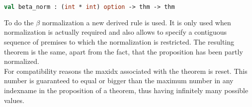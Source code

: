 \begin{lstlisting}[language=ML,breaklines=true]
val beta_norm : (int * int) option -> thm -> thm
\end{lstlisting}

To do the $\beta$ normalization a new derived rule is used. It is only used when normalization is actually required and also allows to specify a contiguous sequence of premises to which the normalization is restricted. The resulting theorem is the same, apart from the fact, that the proposition has been partly normalized.\\
For compatibility reasons the maxidx associated with the theorem is reset. This number is guaranteed to equal or bigger than the maximum number in any indexname in the proposition of a theorem, thus having infinitely many possible values.